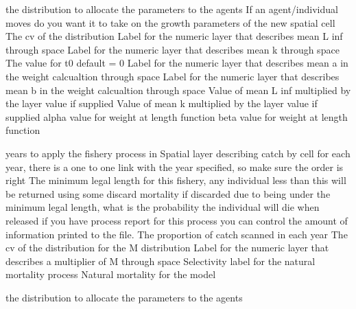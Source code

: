  {the distribution to allocate the parameters to the agents}
 {If an agent/individual moves do you want it to take on the growth parameters of the new spatial cell}
 {The cv of the distribution}
 {Label for the numeric layer that describes mean L inf through space}
 {Label for the numeric layer that describes mean k through space}
 {The value for t0 default = 0}
 {Label for the numeric layer that describes mean a in the weight calcualtion through space}
 {Label for the numeric layer that describes mean b in the weight calcualtion through space}
 {Value of mean L inf multiplied by the layer value if supplied}
 {Value of mean k multiplied by the layer value if supplied}
 {alpha value for weight at length function}
 {beta value for weight at length function}
\par\textbf{}\par
\par\textbf{}\par
{} {years to apply the fishery process in}
 {Spatial layer describing catch by cell for each year, there is a one to one link with the year specified, so make sure the order is right}
 {The minimum legal length for this fishery, any individual less than this will be returned using some discard mortality}
 {if discarded due to being under the minimum legal length, what is the probability the individual will die when released}
 {if you have process report for this process you can control the amount of information printed to the file.}
 {The proportion of catch scanned in each year}
 {The cv of the distribution for the M distribution}
 {Label for the numeric layer that describes a multiplier of M through space}
 {Selectivity label for the natural mortality process}
 {Natural mortality for the model}
\par\textbf{}\par
{} {the distribution to allocate the parameters to the agents}
